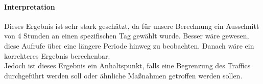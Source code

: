 \paragraph{Interpretation\\}
Dieses Ergebnis ist sehr stark geschätzt, da für unsere Berechnung ein Ausschnitt von 4 Stunden an einen spezifischen Tag gewählt wurde. Besser wäre gewesen, diese Aufrufe über eine längere Periode hinweg zu beobachten. Danach wäre ein korrekteres Ergebnis berechenbar.\\
Jedoch ist dieses Ergebnis ein Anhaltspunkt, falls eine Begrenzung des Traffics durchgeführt werden soll oder ähnliche Maßnahmen getroffen werden sollen.